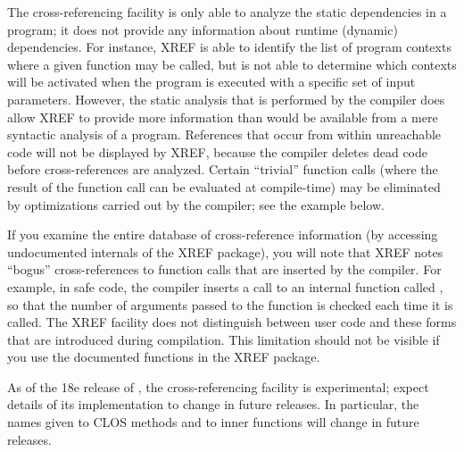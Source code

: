 The cross-referencing facility is only able to analyze the static
dependencies in a program; it does not provide any information about
runtime (dynamic) dependencies. For instance, XREF is able to identify
the list of program contexts where a given function may be called, but
is not able to determine which contexts will be activated when the
program is executed with a specific set of input parameters. However,
the static analysis that is performed by the \cmucl{} compiler does
allow XREF to provide more information than would be available from a
mere syntactic analysis of a program. References that occur from
within unreachable code will not be displayed by XREF, because the
\cmucl{} compiler deletes dead code before cross-references are
analyzed. Certain ``trivial'' function calls (where the result of the
function call can be evaluated at compile-time) may be eliminated by
optimizations carried out by the compiler; see the example below.

If you examine the entire database of cross-reference information (by
accessing undocumented internals of the XREF package), you will note
that XREF notes ``bogus'' cross-references to function calls that are
inserted by the compiler. For example, in safe code, the \cmucl{}
compiler inserts a call to an internal function called
, so that the number of arguments
passed to the function is checked each time it is called. The XREF
facility does not distinguish between user code and these forms that
are introduced during compilation. This limitation should not be
visible if you use the documented functions in the XREF package. 

As of the 18e release of \cmucl{}, the cross-referencing facility is
experimental; expect details of its implementation to change in future
releases. In particular, the names given to CLOS methods and to inner
functions will change in future releases. 

